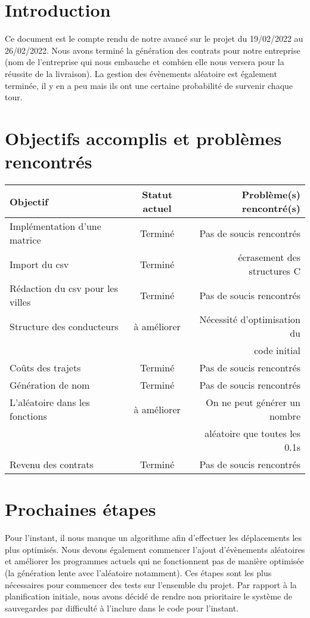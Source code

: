 \documentclass[a4paper, 12pt]{article}
\begin{document}
\newpage



\section*{Introduction}
      Ce document est le compte rendu de notre avancé sur le projet du 19/02/2022 au 26/02/2022. Nous avons terminé la génération des contrats pour notre entreprise (nom de l'entreprise qui nous embauche et combien elle nous versera pour la réussite de la livraison). La gestion des évènements aléatoire est également terminée, il y en a peu mais ils ont une certaine probabilité de survenir chaque tour.

\section{Objectifs accomplis et problèmes rencontrés}
     \begin{tabular}{|l|c|r|}
  \hline
  Objectif & Statut actuel & Problème(s) rencontré(s) \\
  \hline
  Implémentation d'une matrice & Terminé & Pas de soucis rencontrés \\
  Import du csv & Terminé & écrasement des structures C \\
  Rédaction du csv pour les villes & Terminé & Pas de soucis rencontrés\\
  Structure des conducteurs & à améliorer & Nécessité d'optimisation du \\&& code initial\\
  Coûts des trajets & Terminé & Pas de soucis rencontrés\\
  Génération de nom & Terminé & Pas de soucis rencontrés\\
  L'aléatoire dans les fonctions & à améliorer & On ne peut générer un nombre \\&& aléatoire que toutes les 0.1s\\
  Revenu des contrats & Terminé & Pas de soucis rencontrés\\

  \hline
\end{tabular}
\section{Prochaines étapes}
     Pour l'instant, il nous manque un algorithme afin d'effectuer les déplacements les plus optimisés. Nous devons également commencer l'ajout d'évènements aléatoires et améliorer les programmes actuels qui ne fonctionnent pas de manière optimisée (la génération lente avec l'aléatoire notamment). 
     Ces étapes sont les plus nécessaires pour commencer des tests sur l'ensemble du projet. 
     Par rapport à la planification initiale, nous avons décidé de rendre non prioritaire le système de sauvegardes par difficulté à l'inclure dans le code pour l'instant.
    
\end{document}
